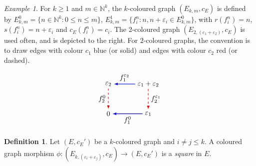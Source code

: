 \documentclass[12pt]{amsart}
\theoremstyle{definition}
\newtheorem{dfn}[thm]{Definition}
\theoremstyle{remark}
\newtheorem{example}[thm]{Example}
\numberwithin{equation}{section}
\begin{document}
\vspace{1em}
\noindent\begin{minipage}[c]{0.78\linewidth}
\begin{example}\label{ex:model coloured graphs} \label{dfn:Ekm}%
For $k \ge 1$ and $m\in \mathbb{N}^k$, the $k$-coloured graph $(E_{k,m},c_E)$ is defined by 
$E_{k,m}^0=\{n\in\mathbb{N}^k:0\le n\le m\}$, $E_{k,m}^1=\{f_i^n : n,n+\varepsilon_i\in E_{k,m}^0\}$, with $r(f_i^n)=n$, $s(f_i^n)=n+\varepsilon_i$ and $c_{E}(f_i^n)=c_i$. 
The 2-coloured graph $(E_{2,(\varepsilon_1+\varepsilon_2)},c_E)$ is used often, and is depicted to the right. For $2$-coloured graphs, the convention is to draw edges with colour $c_1$ blue (or solid) and edges with colour $c_2$ red (or dashed).
\end{example}
\end{minipage}
\begin{minipage}[c]{0.2\linewidth}
\[
\begin{tikzpicture}[>=stealth,yscale=1.5,xscale=2]
\node (00) at (0,0) {$0$};
\node (10) at (1,0) {$\varepsilon_1$}
	edge[-latex,thick,blue] node[auto,black] {$f_1^{0}$} (00);
\node (01) at (0,1) {$\varepsilon_2$}
	edge[-latex,thick,red,dashed] node[auto,black,swap] {$f_{2}^{0}$} (00);
\node (11) at (1,1) {$\varepsilon_1+\varepsilon_2$}
	edge[-latex,thick,blue] node[auto,black,swap] {$f^{\varepsilon_2}_{1}$} (01)
	edge[-latex,thick,red,dashed] node[auto,black] {$f_{2}^{\varepsilon_1}$} (10);
\end{tikzpicture}
\]
\end{minipage}

\begin{dfn} \label{dfn:square}
Let $(E,c_E')$ be a $k$-coloured graph and $i \neq j \leq k$. A coloured graph morphism $\phi: (E_{k,(\varepsilon_i+\varepsilon_j)},c_E) \to (E,c_E')$ is a \emph{square} in $E$.
\end{dfn}
\end{document}
